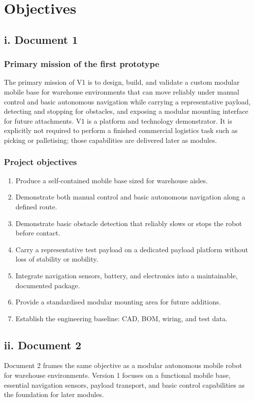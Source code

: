 \chapter{Objectives}

\section*{i. Document 1}

\subsection*{Primary mission of the first prototype}

The primary mission of V1 is to design, build, and validate a custom modular mobile base for warehouse environments that can move reliably under manual control and basic autonomous navigation while carrying a representative payload, detecting and stopping for obstacles, and exposing a modular mounting interface for future attachments. V1 is a platform and technology demonstrator. It is explicitly not required to perform a finished commercial logistics task such as picking or palletising; those capabilities are delivered later as modules.

\subsection*{Project objectives}

\begin{enumerate}
    \item Produce a self-contained mobile base sized for warehouse aisles.
    \item Demonstrate both manual control and basic autonomous navigation along a defined route.
    \item Demonstrate basic obstacle detection that reliably slows or stops the robot before contact.
    \item Carry a representative test payload on a dedicated payload platform without loss of stability or mobility.
    \item Integrate navigation sensors, battery, and electronics into a maintainable, documented package.
    \item Provide a standardised modular mounting area for future additions.
    \item Establish the engineering baseline: CAD, BOM, wiring, and test data.
\end{enumerate}

\section*{ii. Document 2}

Document 2 frames the same objective as a modular autonomous mobile robot for warehouse environments. Version 1 focuses on a functional mobile base, essential navigation sensors, payload transport, and basic control capabilities as the foundation for later modules.
